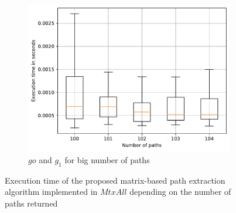 \begin{figure}
	\begin{subfigure}{0.32\textwidth}
		\includegraphics[width=\linewidth,trim=0 0 -1.5cm 0]{pictures/allMatr_go_10_big.pdf}
		\caption{$go$ and $g_1$ for big number of paths} \label{fig:extractTimeGoBigMtx}
	\end{subfigure}
	\caption{Execution time of the proposed matrix-based path extraction algorithm implemented in $MtxAll$ depending on the number of paths returned}
	\label{fig:extractTimeMtx}
\end{figure}
